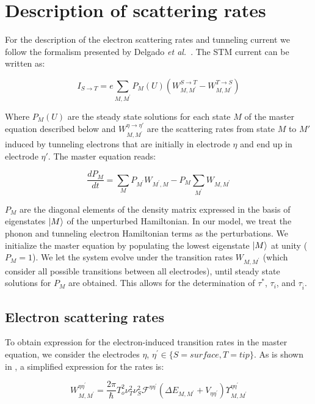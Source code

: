\documentclass[reprint,amsmath,amssymb,aps,nofootinbib,onecolumn]{revtex4-2}
\begin{document}
\section{Description of scattering rates}
For the description of the electron scattering rates and tunneling current we follow the formalism presented by Delgado \textit{et al.}~\cite{delgado2010}. The STM current can be written as:

\begin{equation}
I_{S\rightarrow T} = e \sum_{M,M^{\prime}}P_M(U)\left(W_{M,M^{\prime}}^{S\rightarrow T}-W_{M,M^{\prime}}^{T\rightarrow S}\right)
\label{eq:stm_curr}
\end{equation}

Where $P_M(U)$ are the steady state solutions for each state $M$ of the master equation described below and $W_{M,M^{\prime}}^{\eta \rightarrow \eta'}$ are the scattering rates from state $M$ to $M'$ induced by tunneling electrons that are initially in electrode $\eta$ and end up in electrode $\eta'$. The master equation reads:

\begin{equation}
\dfrac{dP_M}{dt}=\sum_M P_{M^{\prime}}W_{M^{\prime},M} - P_M\sum_{M^{\prime}}W_{M,M^{\prime}}
\end{equation}

$P_M$ are the diagonal elements of the density matrix expressed in the basis of eigenstates $\ket{M}$ of the unperturbed Hamiltonian. In our model, we treat the phonon and tunneling electron Hamiltonian terms as the perturbations. We initialize the master equation by populating the lowest eigenstate $\ket{M}$ at unity ($P_M = 1$). We let the system evolve under the transition rates $W_{M,M^{\prime}}$ (which consider all possible transitions between all electrodes), until steady state solutions for $P_M$ are obtained. This allows for the determination of $\tau^{*}$, $\tau_i$, and $\tau_{\overline{i}}$. 

\subsection{Electron scattering rates}
To obtain expression for the electron-induced transition rates in the master equation, we consider the electrodes $\eta$, $\eta^{\prime} \in\lbrace S=surface, T=tip\rbrace$. As is shown in \cite{delgado2010}, a simplified expression for the rates is:

\begin{equation}
W_{M,M^{\prime}}^{\eta \eta^{\prime}}=\frac{2 \pi}{\hbar} T_o^2 \nu_T^2 \nu_S^2 \mathcal{F}^{\eta\eta^{\prime}}(\Delta E_{M,M^{\prime}} + V_{\eta \eta^{\prime}})\Upsilon^{\eta\eta^{\prime}}_{M,M^{\prime}}
\label{eq:scatt_rates}
\end{equation}
\end{document}
